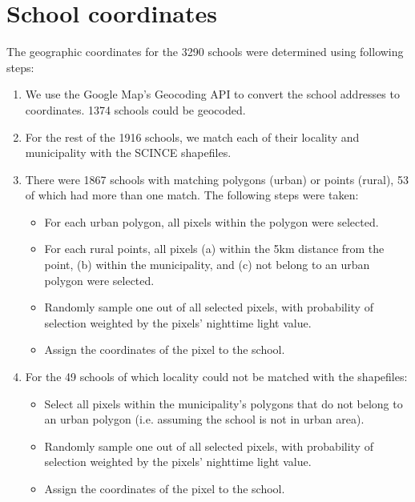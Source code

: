\documentclass{article}
\begin{document}
\section{School coordinates}
The geographic coordinates for the 3290 schools were determined using following steps:
\begin{enumerate}
    \item We use the Google Map's Geocoding API to convert the school addresses to coordinates. 1374 schools could be geocoded.
    \item For the rest of the 1916 schools, we match each of their locality and municipality with the SCINCE shapefiles.
    \item There were 1867 schools with matching polygons (urban) or points (rural), 53 of which had more than one match. The following steps were taken:
    \begin{itemize}
        \item For each urban polygon, all pixels within the polygon were selected.
        \item For each rural points, all pixels (a) within the 5km distance from the point, (b) within the municipality, and (c) not belong to an urban polygon were selected.
        \item Randomly sample one out of all selected pixels, with probability of selection weighted by the pixels' nighttime light value.
        \item Assign the coordinates of the pixel to the school.
    \end{itemize}
    \item For the 49 schools of which locality could not be matched with the shapefiles:
    \begin{itemize}
        \item Select all pixels within the municipality's polygons that do not belong to an urban polygon (i.e. assuming the school is not in urban area).
        \item Randomly sample one out of all selected pixels, with probability of selection weighted by the pixels' nighttime light value.
        \item Assign the coordinates of the pixel to the school.
    \end{itemize}
\end{enumerate}  
\end{document}
